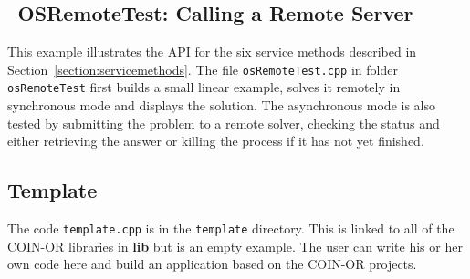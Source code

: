 \documentclass[11pt]{article}
\renewcommand{\_}{{\char"5F}}
\renewcommand{\{}{{\char"7B}}
\renewcommand{\}}{{\char"7D}}
\renewcommand{\^}{{\char"0D}}
\renewcommand{\'}{{\char"0D}}
\begin{document}
\subsection{ \, OSRemoteTest:  Calling a Remote Server}\label{section:exampleOSRemoteTest}

This example illustrates the API for the six service methods described in Section~\ref{section:servicemethods}.
The file {\tt osRemoteTest.cpp} in folder {\tt osRemoteTest} first builds a small linear
example, solves it remotely in synchronous mode and displays the solution.
The asynchronous mode is also tested by submitting the problem to a remote solver,
checking the status and either retrieving the answer or killing the process if it has not
yet finished.

\subsection{Template}\label{section:exampleTemplate} 
The code {\tt template.cpp} is in the {\tt template} directory.  This is linked to all of the 
COIN-OR libraries in {\bf lib} but is an empty example.  The user can write his or her own code 
here and build an application based on the COIN-OR projects. 
\end{document}
